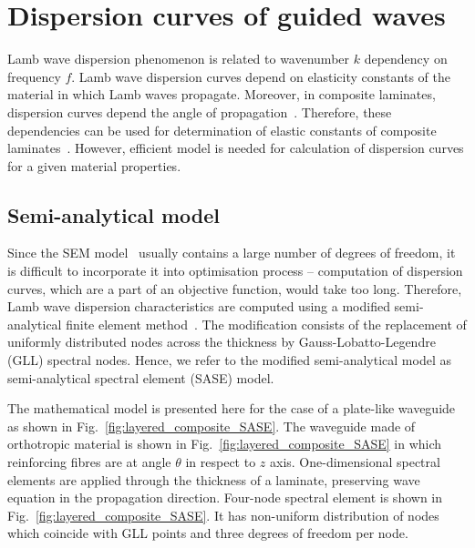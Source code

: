 \documentclass[preprint,12pt]{elsarticle}
\begin{document}
\section{Dispersion curves of guided waves \label{sec:dispersion_curves}}
Lamb wave dispersion phenomenon is related to wavenumber $k$ dependency on frequency $f$. 
Lamb wave dispersion curves depend on elasticity constants of the material in which Lamb waves propagate. 
Moreover, in composite laminates, dispersion curves depend the angle of propagation~\cite{Rose1999}. 
Therefore, these dependencies can be used for determination of elastic constants of composite laminates~\cite{Kudela2020}.
However, efficient model is needed for calculation of dispersion curves for a given material properties.

\subsection{Semi-analytical model}
Since the SEM model~\cite{Kudela2020a} usually contains a large number of degrees of freedom, it is difficult to incorporate it into optimisation process – computation of dispersion curves, which are a part of an objective function, would take too long. 
Therefore, Lamb wave dispersion characteristics are computed using a modified semi-analytical finite element method~\cite{Bartoli2006,Marzani2008}. 
The modification consists of the replacement of uniformly distributed nodes across the thickness by Gauss-Lobatto-Legendre (GLL) spectral nodes. 
Hence, we refer to the modified semi-analytical model as semi-analytical spectral element (SASE) model.
	
The mathematical model is presented here for the case of a plate-like waveguide as shown in Fig.~\ref{fig:layered_composite_SASE}.  
The waveguide made of orthotropic material is shown in Fig.~\ref{fig:layered_composite_SASE} in which reinforcing fibres are at angle $\theta$ in respect to $z$ axis.
One-dimensional spectral elements are applied through the thickness of a laminate, preserving wave equation in the propagation direction.  
Four-node spectral element is shown in Fig.~\ref{fig:layered_composite_SASE}. 
It has non-uniform distribution of nodes which coincide with GLL points and three degrees of freedom per node.
	
\end{document}
